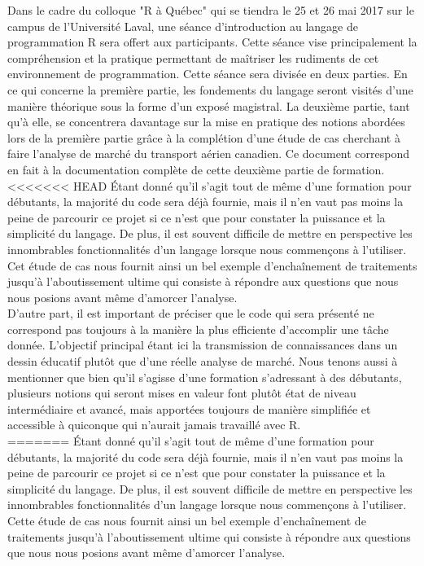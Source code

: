 Dans le cadre du colloque "R à Québec" qui se tiendra le 25 et 26 mai 2017 sur le campus de l'Université Laval, une séance d'introduction au langage de programmation R sera offert aux participants. Cette séance vise principalement la compréhension et la pratique permettant de maîtriser les rudiments de cet environnement de programmation. \cite{RQC2017} Cette séance sera divisée en deux parties. En ce qui concerne la première partie, les fondements du langage seront visités d'une manière théorique sous la forme d'un exposé magistral. La deuxième partie, tant qu'à elle, se concentrera davantage sur la mise en pratique des notions abordées lors de la première partie grâce à la complétion d'une étude de cas cherchant à faire l'analyse de marché du transport aérien canadien. Ce document correspond en fait à la documentation complète de cette deuxième partie de formation. \\

<<<<<<< HEAD
Étant donné qu'il s'agit tout de même d'une formation pour débutants, la majorité du code sera déjà fournie, mais il n'en vaut pas moins la peine de parcourir ce projet si ce n'est que pour constater la puissance et la simplicité du langage. De plus, il est souvent difficile de mettre en perspective les innombrables fonctionnalités d'un langage lorsque nous commençons à l'utiliser. Cet étude de cas nous fournit ainsi un bel exemple d'enchaînement de traitements jusqu'à l'aboutissement ultime qui consiste à répondre aux questions que nous nous posions avant même d'amorcer l'analyse. \\

D'autre part, il est important de préciser que le code qui sera présenté ne correspond pas toujours à la manière la plus efficiente d'accomplir une tâche donnée. L'objectif principal étant ici la transmission de connaissances dans un dessin éducatif plutôt que d'une réelle analyse de marché. Nous tenons aussi à mentionner que bien qu'il s'agisse d'une formation s'adressant à des débutants, plusieurs notions qui seront mises en valeur font plutôt état de niveau intermédiaire et avancé, mais apportées toujours de manière simplifiée et accessible à quiconque qui n'aurait jamais travaillé avec R. \\
=======
\noindent
Étant donné qu'il s'agit tout de même d'une formation pour débutants, la majorité du code sera déjà fournie, mais il n'en vaut pas moins la peine de parcourir ce projet si ce n'est que pour constater la puissance et la simplicité du langage. De plus, il est souvent difficile de mettre en perspective les innombrables fonctionnalités d'un langage lorsque nous commençons à l'utiliser. Cette étude de cas nous fournit ainsi un bel exemple d'enchaînement de traitements jusqu'à l'aboutissement ultime qui consiste à répondre aux questions que nous nous posions avant même d'amorcer l'analyse. \\

